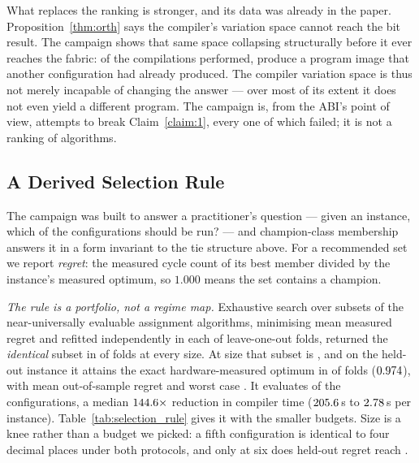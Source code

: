 \documentclass[journal,10pt]{IEEEtran}
\theoremstyle{plain}
\theoremstyle{definition}
\theoremstyle{remark}
\begin{document}
What replaces the ranking is stronger, and its data was already in the paper.
Proposition~\ref{thm:orth} says the compiler's variation space cannot reach
the bit result. The campaign shows that same space collapsing structurally
before it ever reaches the fabric: of the \ClsCompilations{} compilations
performed, \ClsCollapse{} produce a program image that another configuration
had already produced. The compiler variation space is thus not merely
incapable of changing the answer --- over most of its extent it does not even
yield a different program. The campaign is, from the ABI's point of view,
\WallTBs{} attempts to break Claim~\ref{claim:1}, every one of which failed;
it is not a ranking of algorithms.

\subsection{A Derived Selection Rule}\label{sec:selrule}

The campaign was built to answer a practitioner's question --- given an
instance, which of the \SelConfigsTotal{} configurations should be run? ---
and champion-class membership answers it in a form invariant to the tie
structure above. For a recommended set we report \emph{regret}: the measured
cycle count of its best member divided by the instance's measured optimum, so
$1.000$ means the set contains a champion.

\emph{The rule is a portfolio, not a regime map.} Exhaustive search over
subsets of the \SelSearchAlgs{} near-universally evaluable assignment
algorithms, minimising mean measured regret and refitted independently in each
of \SelFolds{} leave-one-out folds, returned the \emph{identical} subset in
\SelFolds{} of \SelFolds{} folds at every size. At size \SelKFour{} that
subset is \SelPortfolio{}, and on the held-out instance it attains the exact
hardware-measured optimum in \SelKFourOpt{} of \TournNInst{} folds
($0.974$), with mean out-of-sample regret \SelKFourMean{} and worst
case \SelKFourWorst{}. It evaluates \SelConfigsRun{} of the
\SelConfigsTotal{} configurations, a median $144.6\times$ reduction in
compiler time ($205.6$\,s to $2.78$\,s per instance).
Table~\ref{tab:selection_rule} gives it with the smaller budgets. Size
\SelKnee{} is a knee rather than a budget we picked: a fifth configuration is
identical to four decimal places under both protocols, and only at six does
held-out regret reach \SelKSixMean{}.
\end{document}
